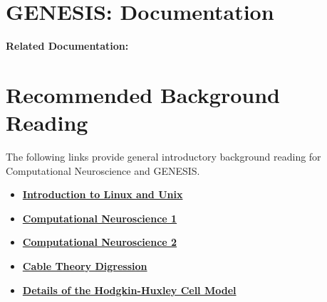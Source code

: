 \documentclass[12pt]{article}
\begin{document}
\section*{GENESIS: Documentation}

{\bf Related Documentation:}

\section*{Recommended Background Reading}

The following links provide general introductory background reading for Computational Neuroscience and GENESIS.

\begin{itemize}
\item \href{../unix-linux/unix-linux.tex}{\bf Introduction to Linux and Unix}
\item \href{../compneurosci1/compneurosci1.tex}{\bf Computational Neuroscience 1}
\item \href{../compneurosci1/compneurosci2.tex}{\bf Computational Neuroscience 2}
\item \href{../cable-theory-digression/cable-theory-digression.tex}{\bf Cable Theory Digression}
\item \href{../hh-model-details/hh-model-details.tex}{\bf Details of the Hodgkin-Huxley Cell Model}
\end{itemize}
\end{document}
